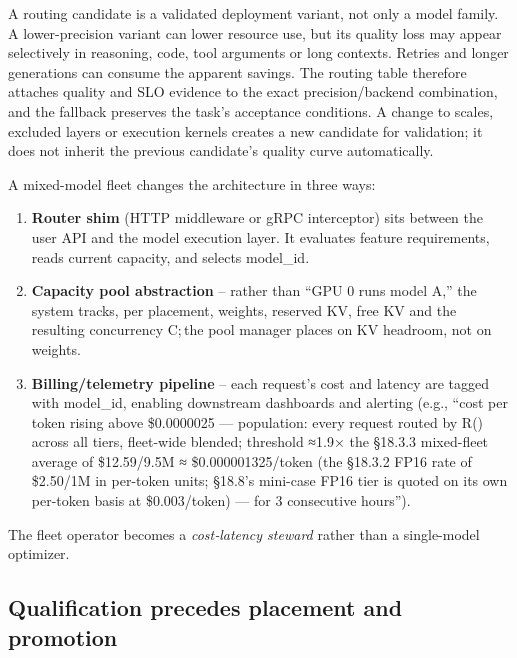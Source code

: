 A routing candidate is a validated deployment variant, not only a model
family. A lower-precision variant can lower resource use, but its
quality loss may appear selectively in reasoning, code, tool arguments
or long contexts. Retries and longer generations can consume the
apparent savings. The routing table therefore attaches quality and SLO
evidence to the exact precision/backend combination, and the fallback
preserves the task's acceptance conditions. A change to scales, excluded
layers or execution kernels creates a new candidate for validation; it
does not inherit the previous candidate's quality curve automatically.

\label{architecture-consequence}


A mixed-model fleet changes the architecture in three ways:

\begin{enumerate}
\def\labelenumi{\arabic{enumi}.}
\tightlist
\item
  \textbf{Router shim} (HTTP middleware or gRPC interceptor) sits
  between the user API and the model execution layer. It evaluates
  feature requirements, reads current capacity, and selects model\_id.
\item
  \textbf{Capacity pool abstraction} -- rather than ``GPU 0 runs model
  A,'' the system tracks, per placement, weights, reserved KV, free KV
  and the resulting concurrency C;\,the pool manager places on KV
  headroom, not on weights.
\item
  \textbf{Billing/telemetry pipeline} -- each request's cost and latency
  are tagged with model\_id, enabling downstream dashboards and alerting
  (e.g., ``cost per token rising above \$0.0000025 --- population: every
  request routed by R() across all tiers, fleet-wide blended; threshold
  ≈1.9× the §18.3.3 mixed-fleet average of \$12.59/9.5M ≈
  \$0.000001325/token (the §18.3.2 FP16 rate of \$2.50/1M in per-token
  units; §18.8's mini-case FP16 tier is quoted on its own per-token
  basis at \$0.003/token) --- for 3 consecutive hours'').
\end{enumerate}

The fleet operator becomes a \emph{cost‑latency steward} rather than a
single-model optimizer.

\subsection*{Qualification precedes placement and
promotion}\label{qualification-precedes-placement-and-promotion}

